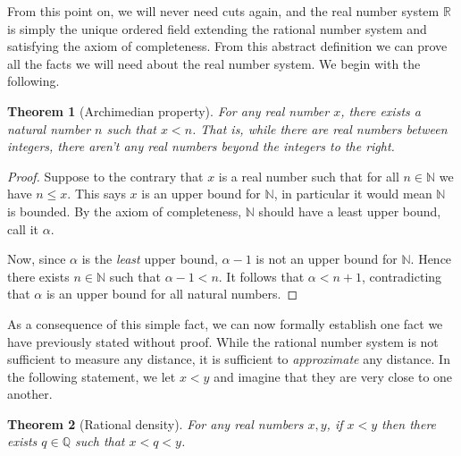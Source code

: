 \documentclass[11pt,oneside]{amsbook}
\newcommand{\N}{\mathbb N}
\newcommand{\Q}{\mathbb Q}
\newcommand{\R}{\mathbb R}
\theoremstyle{definition}
\theoremstyle{plain}
\newtheorem{theorem}{Theorem}[section]
\theoremstyle{definition}
\theoremstyle{remark}
\numberwithin{equation}{section}
\numberwithin{figure}{section}
\begin{document}
From this point on, we will never need cuts again, and the real number system $\R$ is simply the unique ordered field extending the rational number system and satisfying the axiom of completeness. From this abstract definition we can prove all the facts we will need about the real number system. We begin with the following.

\begin{theorem}[Archimedian property]
  For any real number $x$, there exists a natural number $n$ such that $x<n$. That is, while there are real numbers between integers, there aren't any real numbers beyond the integers to the right.
\end{theorem}

\begin{proof}
  Suppose to the contrary that $x$ is a real number such that for all $n\in\N$ we have $n\leq x$. This says $x$ is an upper bound for $\N$, in particular it would mean $\N$ is bounded. By the axiom of completeness, $\N$ should have a least upper bound, call it $\alpha$.

  Now, since $\alpha$ is the \emph{least} upper bound, $\alpha-1$ is not an upper bound for $\N$. Hence there exists $n\in\N$ such that $\alpha-1<n$. It follows that $\alpha<n+1$, contradicting that $\alpha$ is an upper bound for all natural numbers.
\end{proof}

\begin{center}
\end{center}

As a consequence of this simple fact, we can now formally establish one fact we have previously stated without proof. While the rational number system is not sufficient to measure any distance, it is sufficient to \emph{approximate} any distance. In the following statement, we let $x<y$ and imagine that they are very close to one another.

\begin{theorem}[Rational density]
  For any real numbers $x,y$, if $x<y$ then there exists $q\in\Q$ such that $x<q<y$.
\end{theorem}
\end{document}
